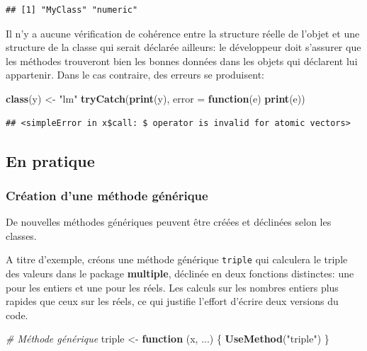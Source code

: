 \documentclass[
  12pt,
  french,
  a4paper,
  extrafontsizes,onecolumn,openright
  ]{memoir}
\newenvironment{Shaded}{\begin{snugshade}}{\end{snugshade}}
\newcommand{\AttributeTok}[1]{\textcolor[rgb]{0.13,0.29,0.53}{#1}}
\newcommand{\CommentTok}[1]{\textcolor[rgb]{0.56,0.35,0.01}{\textit{#1}}}
\newcommand{\ControlFlowTok}[1]{\textcolor[rgb]{0.13,0.29,0.53}{\textbf{#1}}}
\newcommand{\FunctionTok}[1]{\textcolor[rgb]{0.13,0.29,0.53}{\textbf{#1}}}
\newcommand{\NormalTok}[1]{#1}
\newcommand{\OtherTok}[1]{\textcolor[rgb]{0.56,0.35,0.01}{#1}}
\newcommand{\StringTok}[1]{\textcolor[rgb]{0.31,0.60,0.02}{#1}}
\begin{document}
\begin{verbatim}
## [1] "MyClass" "numeric"
\end{verbatim}

\normalsize

Il n'y a aucune vérification de cohérence entre la structure réelle de l'objet et une structure de la classe qui serait déclarée ailleurs: le développeur doit s'assurer que les méthodes trouveront bien les bonnes données dans les objets qui déclarent lui appartenir.
Dans le cas contraire, des erreurs se produisent:

\scriptsize

\begin{Shaded}
\begin{Highlighting}[]
\FunctionTok{class}\NormalTok{(y) }\OtherTok{\textless{}{-}} \StringTok{"lm"}
\FunctionTok{tryCatch}\NormalTok{(}\FunctionTok{print}\NormalTok{(y), }\AttributeTok{error =} \ControlFlowTok{function}\NormalTok{(e) }\FunctionTok{print}\NormalTok{(e))}
\end{Highlighting}
\end{Shaded}

\begin{verbatim}
## <simpleError in x$call: $ operator is invalid for atomic vectors>
\end{verbatim}

\normalsize

\subsection{En pratique}\label{en-pratique}

\subsubsection{Création d'une méthode générique}\label{cruxe9ation-dune-muxe9thode-guxe9nuxe9rique}

De nouvelles méthodes génériques peuvent être créées et déclinées selon les classes.

A titre d'exemple, créons une méthode générique \texttt{triple} qui calculera le triple des valeurs dans le package \textbf{multiple}, déclinée en deux fonctions distinctes: une pour les entiers et une pour les réels.
Les calculs sur les nombres entiers plus rapides que ceux sur les réels, ce qui justifie l'effort d'écrire deux versions du code.

\scriptsize

\begin{Shaded}
\begin{Highlighting}[]
\CommentTok{\# Méthode générique}
\NormalTok{triple }\OtherTok{\textless{}{-}} \ControlFlowTok{function}\NormalTok{ (x, ...) \{}
  \FunctionTok{UseMethod}\NormalTok{(}\StringTok{"triple"}\NormalTok{)}
\NormalTok{\}}
\end{Highlighting}
\end{Shaded}
\end{document}
